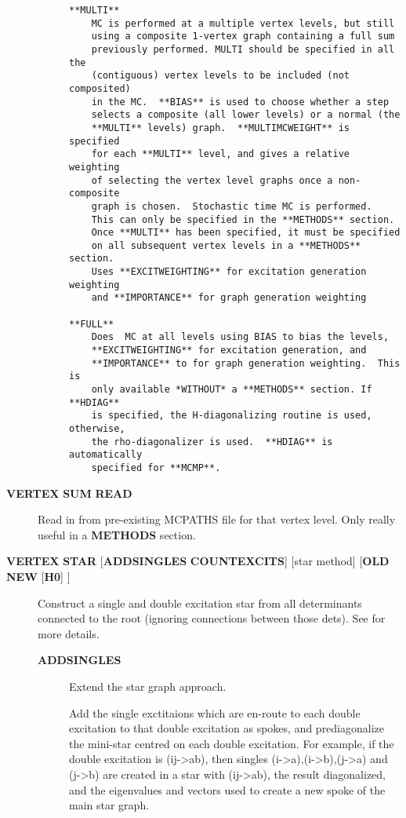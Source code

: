 \documentclass[openany,a4paper,10pt]{manual}
\begin{document}
\begin{description}
\begin{description}
\begin{notice}[warning]
\begin{Verbatim}[commandchars=@\[\]]
**MULTI**
    MC is performed at a multiple vertex levels, but still
    using a composite 1-vertex graph containing a full sum
    previously performed. MULTI should be specified in all the
    (contiguous) vertex levels to be included (not composited)
    in the MC.  **BIAS** is used to choose whether a step
    selects a composite (all lower levels) or a normal (the
    **MULTI** levels) graph.  **MULTIMCWEIGHT** is specified
    for each **MULTI** level, and gives a relative weighting
    of selecting the vertex level graphs once a non-composite
    graph is chosen.  Stochastic time MC is performed.
    This can only be specified in the **METHODS** section.
    Once **MULTI** has been specified, it must be specified
    on all subsequent vertex levels in a **METHODS** section.
    Uses **EXCITWEIGHTING** for excitation generation weighting
    and **IMPORTANCE** for graph generation weighting

**FULL**
    Does  MC at all levels using BIAS to bias the levels,
    **EXCITWEIGHTING** for excitation generation, and
    **IMPORTANCE** to for graph generation weighting.  This is
    only available *WITHOUT* a **METHODS** section. If **HDIAG**
    is specified, the H-diagonalizing routine is used, otherwise,
    the rho-diagonalizer is used.  **HDIAG** is automatically
    specified for **MCMP**.
\end{Verbatim}
\end{notice}

\end{description}

\item[\textbf{VERTEX} \textbf{SUM} \textbf{READ}]
Read in from pre-existing MCPATHS file for that vertex level.
Only really useful in a \textbf{METHODS} section.

\item[\textbf{VERTEX} \textbf{STAR} {[}\textbf{ADDSINGLES} \textbf{COUNTEXCITS}{]} {[}star method{]} {[}\textbf{OLD} \textbf{NEW} {[}\textbf{H0}{]} {]}]
Construct a single and double excitation star from all determinants
connected to the root (ignoring connections between those dets).
See \cite{StarPaper} for more details.
\begin{description}
\item[\textbf{ADDSINGLES}]
Extend the star graph approach.

Add the single exctitaions which are en-route to each double
excitation to that double excitation as spokes, and prediagonalize
the mini-star centred on each double excitation.  For example,
if the double excitation is (ij-\textgreater{}ab), then singles
(i-\textgreater{}a),(i-\textgreater{}b),(j-\textgreater{}a) and (j-\textgreater{}b) are created in a star with
(ij-\textgreater{}ab), the result diagonalized, and the eigenvalues and
vectors used to create a new spoke of the main star graph.


\end{description}
\end{description}
\end{document}
